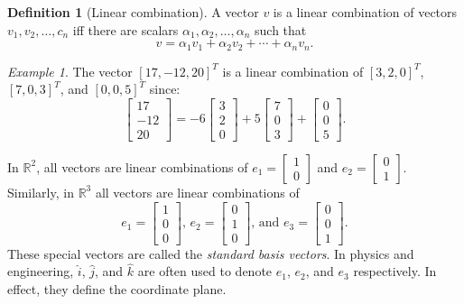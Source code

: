 \documentclass[10pt, a4paper]{amsart}
\theoremstyle{definition}
\newtheorem{defn}{Definition}
\theoremstyle{remark}
\newtheorem{ex}{Example}
\begin{document}
\begin{defn}[Linear combination]
  A vector $ v $ is a linear combination of vectors $ v_1, v_2, \dots, c_n $ iff there
  are scalars $ \alpha_1, \alpha_2, \dots, \alpha_n $ such that
  \begin{displaymath}
    v = \alpha_1 v_1 + \alpha_2 v_2 + \cdots + \alpha_n v_n.
  \end{displaymath}
\end{defn}

\begin{ex}
  The vector $ [17, -12, 20]^T $ is a linear combination of $ [3, 2, 0]^T $, $ [7, 0, 3]^T $, and $ [0, 0, 5]^T $
  since:
  \begin{displaymath}
   \begin{bmatrix} 17 \\ -12 \\ 20 \end{bmatrix} = -6 \begin{bmatrix} 3 \\ 2 \\ 0 \end{bmatrix}
                                                   +5 \begin{bmatrix} 7 \\ 0 \\ 3 \end{bmatrix}
                                                   +  \begin{bmatrix} 0 \\ 0 \\ 5 \end{bmatrix}.
  \end{displaymath}
\end{ex}

In $ \mathbb{R}^2 $, all vectors are linear combinations of $ e_1 = \begin{bmatrix} 1 \\ 0 \end{bmatrix} $ and $ e_2 = \begin{bmatrix} 0 \\ 1 \end{bmatrix} $.
Similarly, in $ \mathbb{R}^3 $ all vectors are linear combinations of
\begin{displaymath}
  e_1 = \begin{bmatrix} 1 \\ 0 \\ 0 \end{bmatrix} \text{, }
  e_2 = \begin{bmatrix} 0 \\ 1 \\ 0 \end{bmatrix} \text{, and }
  e_3 = \begin{bmatrix} 0 \\ 0 \\ 1 \end{bmatrix}.
\end{displaymath}
These special vectors are called the \emph{standard basis vectors}. In physics and
engineering, $ \hat i $, $ \hat j $, and $ \hat k $ are often used to denote $ e_1 $, $ e_2 $,
and $ e_3 $ respectively. In effect, they define the coordinate plane.
\end{document}

